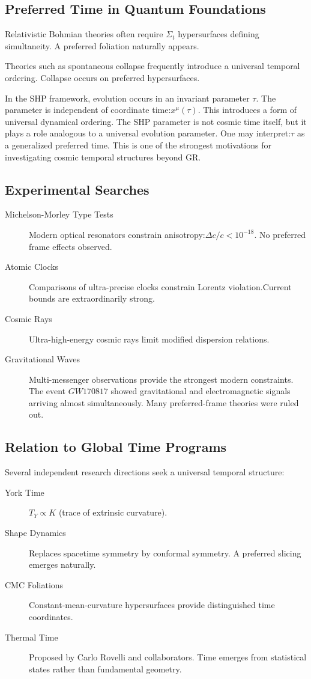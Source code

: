 \subsection{Preferred Time in Quantum Foundations}
Relativistic Bohmian theories often require $ \Sigma_t $
hypersurfaces defining simultaneity.
A preferred foliation naturally appears.

Theories such as spontaneous collapse frequently introduce a universal temporal ordering.
Collapse occurs on preferred hypersurfaces.

In the SHP framework, evolution occurs in an invariant parameter
$ \tau $. The parameter is independent of coordinate time:$ x^\mu(\tau). $
This introduces a form of universal dynamical ordering.
The SHP parameter is not cosmic time itself, but it plays a role analogous
to a universal evolution parameter.
One may interpret:$ \tau $
as a generalized preferred time.
This is one of the strongest motivations for investigating cosmic temporal
structures beyond GR.

\subsection{ Experimental Searches}
\begin{description}
    \item [Michelson-Morley Type Tests ] Modern optical resonators constrain anisotropy:$ \Delta c/c<10^{-18} .$ No preferred frame effects observed.
    \item [Atomic Clocks ] Comparisons of ultra-precise clocks constrain Lorentz violation.Current bounds are extraordinarily strong.
    \item [Cosmic Rays ] Ultra-high-energy cosmic rays limit modified dispersion relations.
    \item [Gravitational Waves ] Multi-messenger observations provide the
        strongest modern constraints. The event $GW170817$ showed
        gravitational and electromagnetic signals
arriving almost simultaneously.
Many preferred-frame theories were ruled out.
\end{description}
\subsection{ Relation to Global Time Programs}
Several independent research directions seek a universal temporal structure:
\begin{description}
    \item [ York Time] $ T_Y \propto K $ (trace of extrinsic curvature).
    \item [ Shape Dynamics] Replaces spacetime symmetry by conformal symmetry. 
        A preferred slicing emerges naturally.
    \item [ CMC Foliations] Constant-mean-curvature hypersurfaces provide distinguished time coordinates.
    \item [ Thermal Time] Proposed by Carlo Rovelli and collaborators.
Time emerges from statistical states rather than fundamental geometry.
\end{description}

